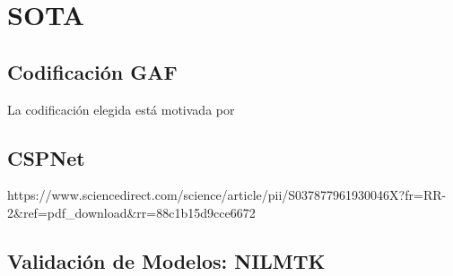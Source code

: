 \section{SOTA}
\subsection{Codificación GAF} 
La codificación elegida está motivada por  
\subsection{CSPNet}     
https://www.sciencedirect.com/science/article/pii/S037877961930046X?fr=RR-2&ref=pdf_download&rr=88c1b15d9cce6672

\subsection{Validación de Modelos: NILMTK}  
